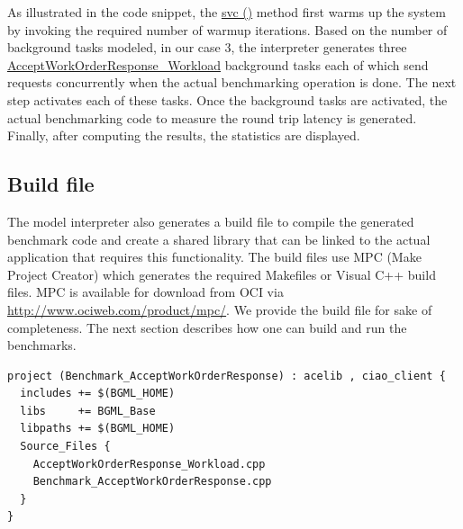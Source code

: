 \documentclass[onecolumn]{article}
\begin{document}
\normalsize 
As illustrated in the code snippet, the \url{svc ()} method first warms up
the system by invoking the required number of warmup iterations. Based on the number
of background tasks modeled, in our case 3, the interpreter generates three
\url{AcceptWorkOrderResponse_Workload} background tasks each of which send requests
concurrently when the actual benchmarking operation is done. The next
step activates each of these tasks. Once the background tasks are
activated, the actual benchmarking code to measure the round trip
latency is generated. Finally, after computing the results, the
statistics are displayed.

\subsection* {Build file}
The model interpreter also generates a build file to compile the generated benchmark
code and create a shared library that can be linked to the actual application that
requires this functionality. The build files use MPC (Make Project Creator) which
generates the required Makefiles or Visual C++ build files. MPC is available for
download from OCI via \url{http://www.ociweb.com/product/mpc/}. We provide the
build file for sake of completeness. The next section describes how one can build
and run the benchmarks.

{
\footnotesize
\begin{verbatim}
project (Benchmark_AcceptWorkOrderResponse) : acelib , ciao_client {
  includes += $(BGML_HOME)
  libs     += BGML_Base
  libpaths += $(BGML_HOME)
  Source_Files {
    AcceptWorkOrderResponse_Workload.cpp
    Benchmark_AcceptWorkOrderResponse.cpp
  }
}
\end{verbatim}
}
\normalsize
\end{document}
